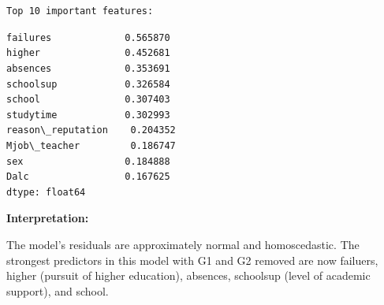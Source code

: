 \documentclass[9pt]{article}
\begin{document}
    \begin{center}
    \end{center}
    { \hspace*{\fill} \\}
    
    \begin{center}
    \end{center}
    { \hspace*{\fill} \\}
    
    \begin{Verbatim}[commandchars=\\\{\}]
Top 10 important features:
    \end{Verbatim}

    
    \begin{Verbatim}[commandchars=\\\{\}]
failures             0.565870
higher               0.452681
absences             0.353691
schoolsup            0.326584
school               0.307403
studytime            0.302993
reason\_reputation    0.204352
Mjob\_teacher         0.186747
sex                  0.184888
Dalc                 0.167625
dtype: float64
    \end{Verbatim}

    
    \textbf{Interpretation:}

The model's residuals are approximately normal and homoscedastic. The
strongest predictors in this model with G1 and G2 removed are now
failuers, higher (pursuit of higher education), absences, schoolsup
(level of academic support), and school.


    
    
    
\end{document}
